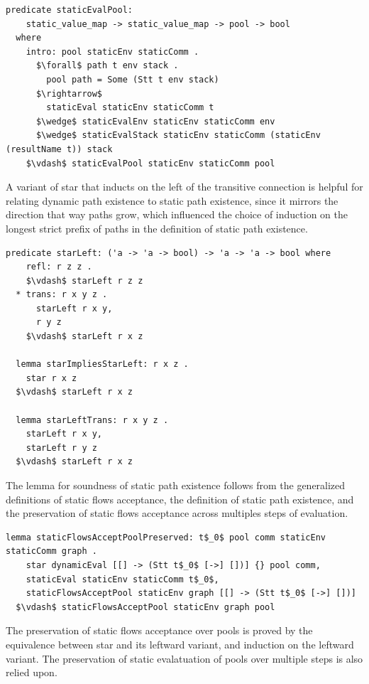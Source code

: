 \documentclass[letterpaper, 11pt]{report}
\begin{document}
\begin{lstlisting}[language=logic, mathescape]
  predicate staticEvalPool:
    static_value_map -> static_value_map -> pool -> bool
  where
    intro: pool staticEnv staticComm .
      $\forall$ path t env stack .
        pool path = Some (Stt t env stack)
      $\rightarrow$ 
        staticEval staticEnv staticComm t
      $\wedge$ staticEvalEnv staticEnv staticComm env
      $\wedge$ staticEvalStack staticEnv staticComm (staticEnv (resultName t)) stack
    $\vdash$ staticEvalPool staticEnv staticComm pool
  \end{lstlisting}


A variant of star that inducts on the left of the transitive connection is helpful for
relating dynamic path existence to static path existence, since it mirrors the direction that way
paths grow, which influenced the choice of induction on the longest strict prefix of paths
in the definition of static path existence.

\begin{lstlisting}[language=logic, mathescape]
  predicate starLeft: ('a -> 'a -> bool) -> 'a -> 'a -> bool where
    refl: r z z .
    $\vdash$ starLeft r z z
  * trans: r x y z .
      starLeft r x y,
      r y z
    $\vdash$ starLeft r x z

  lemma starImpliesStarLeft: r x z .
    star r x z
  $\vdash$ starLeft r x z

  lemma starLeftTrans: r x y z .
    starLeft r x y,
    starLeft r y z 
  $\vdash$ starLeft r x z
\end{lstlisting}

The lemma for soundness of static path existence follows from the generalized definitions
of static flows acceptance, the definition of static path existence, and the preservation
of static flows acceptance across multiples steps of evaluation.

\begin{lstlisting}[language=logic, mathescape]
  lemma staticFlowsAcceptPoolPreserved: t$_0$ pool comm staticEnv staticComm graph .
    star dynamicEval [[] -> (Stt t$_0$ [->] [])] {} pool comm, 
    staticEval staticEnv staticComm t$_0$,
    staticFlowsAcceptPool staticEnv graph [[] -> (Stt t$_0$ [->] [])]
  $\vdash$ staticFlowsAcceptPool staticEnv graph pool 
\end{lstlisting}

The preservation of static flows acceptance over pools is proved by the
equivalence between star and its leftward variant, and induction on the leftward variant.
The preservation of static evalatuation of pools over multiple steps is also relied upon.
\end{document}
